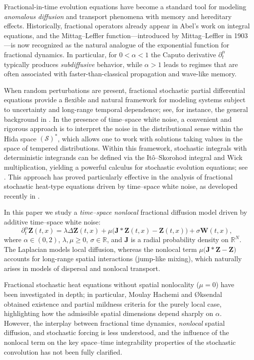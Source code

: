 \documentclass[12pt, reqno]{amsart}
\newcommand{\bz}{\ensuremath{\mathbf{Z}}}
\newcommand{\bj}{\ensuremath{\mathbf{J}}}
\newcommand{\bw}{\ensuremath{\mathbf{W}}}
\begin{document}
Fractional-in-time evolution equations have become a standard tool for modeling \emph{anomalous diffusion} and
transport phenomena with memory and hereditary effects.  Historically, fractional operators already appear
in Abel's work on integral equations, and the Mittag--Leffler function---introduced by Mittag--Leffler in 1903---is
now recognized as the natural analogue of the exponential function for fractional dynamics.  In particular,
for $0<\alpha<1$ the Caputo derivative $\partial_t^\alpha$ typically produces \emph{subdiffusive} behavior, while
$\alpha>1$ leads to regimes that are often associated with faster-than-classical propagation and wave-like memory.

When random perturbations are present, fractional stochastic partial differential equations provide a flexible and
natural framework for modeling systems subject to uncertainty and long-range temporal dependence; see, for instance,
the general background in \cite{GM1998,Gorenflo2020,Podlubny1999,KST}.
In the presence of time--space white noise, a convenient and rigorous approach is to interpret the noise in the
distributional sense within the Hida space $(\mathscr{S})^\ast$, which allows one to work with solutions taking values
in the space of tempered distributions.
Within this framework, stochastic integrals with deterministic integrands can be defined via the
It\^o--Skorohod integral and Wick multiplication, yielding a powerful calculus for stochastic evolution equations;
see \cite{Benth,HidaBook,LindstromUboe}.
This approach has proved particularly effective in the analysis of fractional stochastic heat-type equations driven by
time--space white noise, as developed recently in \cite{Hach}.

In this paper we study a \emph{time--space nonlocal} fractional diffusion model driven by additive time--space white noise:
\begin{equation}
    \label{Main-eq}
    \partial^\alpha_t \bz(t,x)= \lambda \Delta \bz(t,x) + \mu\Big(\mathbf{J}\ast\bz(t,x)-\bz(t,x)\Big)+\sigma \bw(t,x),
\end{equation}
where $\alpha\in(0,2)$, $\lambda,\mu\ge0$, $\sigma\in\mathbb{R}$, and $\bj$ is a radial probability density on
$\mathbb{R}^N$.  The Laplacian models local diffusion, whereas the nonlocal term $\mu\Big(\mathbf{J}\ast\bz-\bz\Big)$ accounts for
long-range spatial interactions (jump-like mixing), which naturally arises in models of dispersal and nonlocal
transport.

Fractional stochastic heat equations without spatial nonlocality ($\mu=0$) have been investigated in depth; in
particular, Moulay Hachemi and \O ksendal \cite{Hach} obtained existence and partial mildness criteria for the purely local
case, highlighting how the admissible spatial dimensions depend sharply on $\alpha$.
However, the interplay between fractional time dynamics, \emph{nonlocal} spatial diffusion, and stochastic forcing
is less understood, and the influence of the nonlocal term on the key space--time integrability properties of the
stochastic convolution has not been fully clarified.
\end{document}
